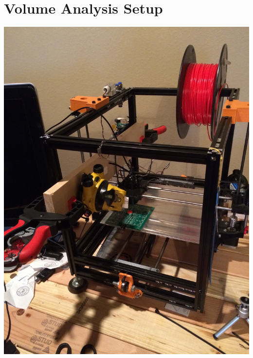 \documentclass[12pt]{article}
\begin{document}
\section{Volume Analysis Setup}
\includegraphics[scale=0.1,angle=270]{images/volume_analysis_setup/IMG_0604.JPG}
\end{document}
